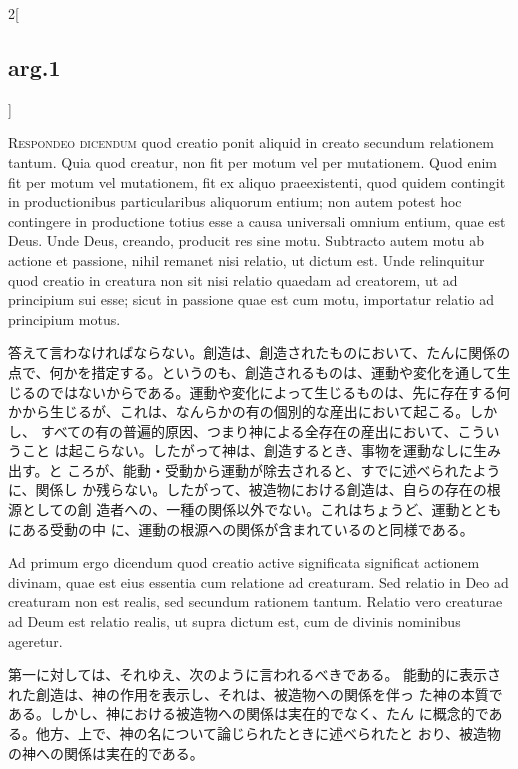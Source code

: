 \documentclass[paper=a4paper,fontsize=10pt,jafontsize=9pt,titlepage]{jlreq}
\begin{document}
\begin{paracol}{2}[\subsection{arg.1}]

{\scshape Respondeo dicendum} quod creatio ponit aliquid in creato secundum
 relationem tantum. Quia quod creatur, non fit per motum vel per
 mutationem. Quod enim fit per motum vel mutationem, fit ex aliquo
 praeexistenti, quod quidem contingit in productionibus particularibus
 aliquorum entium; non autem potest hoc contingere in productione totius
 esse a causa universali omnium entium, quae est Deus. Unde Deus,
 creando, producit res sine motu. Subtracto autem motu ab actione et
 passione, nihil remanet nisi relatio, ut dictum est. Unde relinquitur
 quod creatio in creatura non sit nisi relatio quaedam ad creatorem, ut
 ad principium sui esse; sicut in passione quae est cum motu, importatur
 relatio ad principium motus.

\switchcolumn

答えて言わなければならない。創造は、創造されたものにおいて、たんに関係の
点で、何かを措定する。というのも、創造されるものは、運動や変化を通して生
じるのではないからである。運動や変化によって生じるものは、先に存在する何
かから生じるが、これは、なんらかの有の個別的な産出において起こる。しかし、
すべての有の普遍的原因、つまり神による全存在の産出において、こういうこと
は起こらない。したがって神は、創造するとき、事物を運動なしに生み出す。と
ころが、能動・受動から運動が除去されると、すでに述べられたように、関係し
か残らない。したがって、被造物における創造は、自らの存在の根源としての創
造者への、一種の関係以外でない。これはちょうど、運動とともにある受動の中
に、運動の根源への関係が含まれているのと同様である。

\switchcolumn*[\subsection{ad.1}]

Ad primum ergo dicendum quod creatio active significata significat
 actionem divinam, quae est eius essentia cum relatione ad
 creaturam. Sed relatio in Deo ad creaturam non est realis, sed secundum
 rationem tantum. Relatio vero creaturae ad Deum est relatio realis, ut
 supra dictum est, cum de divinis nominibus ageretur.

\switchcolumn

第一に対しては、それゆえ、次のように言われるべきである。
能動的に表示された創造は、神の作用を表示し、それは、被造物への関係を伴っ
 た神の本質である。しかし、神における被造物への関係は実在的でなく、たん
 に概念的である。他方、上で、神の名について論じられたときに述べられたと
 おり、被造物の神への関係は実在的である。


\end{paracol}
\end{document}
